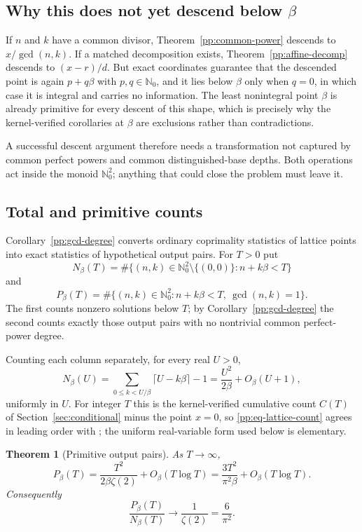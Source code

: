 \documentclass[11pt,oneside]{article}
\newtheorem{theorem}{Theorem}[section]
\theoremstyle{definition}
\theoremstyle{remark}
\newcommand{\Nzero}{\mathbb N_0}
\newcommand{\lean}[1]{\texttt{\detokenize{#1}}}
\begin{document}
\subsection{Why this does not yet descend below \texorpdfstring{$\beta$}{beta}}

If $n$ and $k$ have a common divisor, Theorem~\ref{pp:common-power} descends to
$x/\gcd(n,k)$.  If a matched decomposition exists, Theorem~\ref{pp:affine-decomp} descends to
$(x-r)/d$.  But exact coordinates guarantee that the descended point is again $p+q\beta$ with
$p,q\in\Nzero$, and it lies below $\beta$ only when $q=0$, in which case it is integral and
carries no information.  The least nonintegral point $\beta$ is already primitive for every
descent of this shape, which is precisely why the kernel-verified corollaries at $\beta$ are
exclusions rather than contradictions.

A successful descent argument therefore needs a transformation not captured by common perfect
powers and common distinguished-base depths.  Both operations act inside the monoid
$\Nzero^2$; anything that could close the problem must leave it.

\subsection{Total and primitive counts}

Corollary~\ref{pp:gcd-degree} converts ordinary coprimality statistics of lattice points into
exact statistics of hypothetical output pairs.  For $T>0$ put
\[
 N_{\beta}(T)=\#\bigl\{(n,k)\in\Nzero^2\setminus\{(0,0)\}:n+k\beta<T\bigr\}
\]
and
\[
 P_{\beta}(T)=\#\bigl\{(n,k)\in\Nzero^2:n+k\beta<T,\ \gcd(n,k)=1\bigr\}.
\]
The first counts nonzero solutions below $T$; by Corollary~\ref{pp:gcd-degree} the second
counts exactly those output pairs with no nontrivial common perfect-power degree.

Counting each column separately, for every real $U>0$,
\begin{equation}
 N_{\beta}(U)=\sum_{0\le k<U/\beta}\bigl\lceil U-k\beta\bigr\rceil-1
 =\frac{U^2}{2\beta}+O_{\beta}(U+1),
\label{pp:eq-lattice-count}
\end{equation}
uniformly in $U$.  For integer $T$ this is the kernel-verified cumulative count $C(T)$ of
Section~\ref{sec:conditional} minus the point $x=0$, so \eqref{pp:eq-lattice-count} agrees in
leading order with \lean{QuadraticAsymptotic}; the uniform real-variable form used below is
elementary.

\begin{theorem}[Primitive output pairs]
\label{pp:primitive-asymptotic}
As $T\to\infty$,
\[
 P_{\beta}(T)
 =\frac{T^2}{2\beta\zeta(2)}+O_{\beta}(T\log T)
 =\frac{3T^2}{\pi^2\beta}+O_{\beta}(T\log T).
\]
Consequently
\[
 \frac{P_{\beta}(T)}{N_{\beta}(T)}\longrightarrow\frac1{\zeta(2)}=\frac6{\pi^2}.
\]
\end{theorem}
\end{document}
